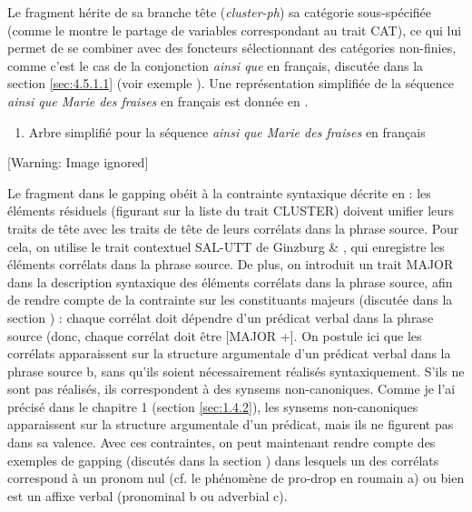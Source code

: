 Le fragment hérite de sa branche tête (\textit{cluster-ph}) sa catégorie sous-spécifiée (comme le montre le partage de variables correspondant au trait CAT), ce qui lui permet de se combiner avec des foncteurs sélectionnant des catégories non-finies, comme c'est le cas de la conjonction \textit{ainsi que} en français, discutée dans la section \ref{sec:4.5.1.1} (voir exemple ). Une représentation simplifiée de la séquence \textit{ainsi que Marie des fraises} en français est donnée en . 


\begin{enumerate}
\item \label{bkm:Ref299905788}Arbre simplifié pour la séquence \textit{ainsi que Marie des fraises} en français 


\end{enumerate}
{   [Warning: Image ignored] %
} 

Le fragment dans le gapping obéit à la contrainte syntaxique décrite en  : les éléments résiduels (figurant sur la liste du trait CLUSTER) doivent unifier leurs traits de tête avec les traits de tête de leurs corrélats dans la phrase source. Pour cela, on utilise le trait contextuel SAL-UTT de Ginzburg \& \citet{Sag2000}, qui enregistre les éléments corrélats dans la phrase source. De plus, on introduit un trait MAJOR dans la description syntaxique des éléments corrélats dans la phrase source, afin de rendre compte de la contrainte sur les constituants majeurs (discutée dans la section ) : chaque corrélat doit dépendre d'un prédicat verbal dans la phrase source (donc, chaque corrélat doit être [MAJOR +]. On postule ici que les corrélats apparaissent sur la structure argumentale d'un prédicat verbal dans la phrase source b, sans qu'ils soient nécessairement réalisés syntaxiquement. S'ils ne sont pas réalisés, ils correspondent à des synsems non-canoniques. Comme je l'ai précisé dans le chapitre 1 (section \ref{sec:1.4.2}), les synsems non-canoniques apparaissent sur la structure argumentale d'un prédicat, mais ils ne figurent pas dans sa valence. Avec ces contraintes, on peut maintenant rendre compte des exemples de gapping (discutés dans la section ) dans lesquels un des corrélats correspond à un pronom nul (cf. le phénomène de pro-drop en roumain a) ou bien est un affixe verbal (pronominal b ou adverbial c).  


